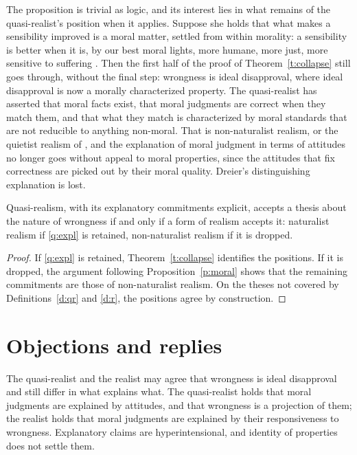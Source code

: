 \documentclass{situationist-preprint}
\begin{document}
The proposition is trivial as logic, and its interest lies in what remains of the quasi-realist's position when it applies. Suppose she holds that what makes a sensibility improved is a moral matter, settled from within morality: a sensibility is better when it is, by our best moral lights, more humane, more just, more sensitive to suffering \citep{Blackburn1998}. Then the first half of the proof of Theorem~\ref{t:collapse} still goes through, without the final step: wrongness is ideal disapproval, where ideal disapproval is now a morally characterized property. The quasi-realist has asserted that moral facts exist, that moral judgments are correct when they match them, and that what they match is characterized by moral standards that are not reducible to anything non-moral. That is non-naturalist realism, or the quietist realism of \citet{Dworkin1996}, and the explanation of moral judgment in terms of attitudes no longer goes without appeal to moral properties, since the attitudes that fix correctness are picked out by their moral quality. Dreier's distinguishing explanation is lost.

\begin{corollary}\label{c:indist}
Quasi-realism, with its explanatory commitments explicit, accepts a thesis about the nature of wrongness if and only if a form of realism accepts it: naturalist realism if \ref{q:expl} is retained, non-naturalist realism if it is dropped.
\end{corollary}

\begin{proof}
If \ref{q:expl} is retained, Theorem~\ref{t:collapse} identifies the positions. If it is dropped, the argument following Proposition~\ref{p:moral} shows that the remaining commitments are those of non-naturalist realism. On the theses not covered by Definitions~\ref{d:qr} and \ref{d:r}, the positions agree by construction.
\end{proof}

\section{Objections and replies}\label{s:obj}

\begin{objection}
The quasi-realist and the realist may agree that wrongness is ideal disapproval and still differ in what explains what. The quasi-realist holds that moral judgments are explained by attitudes, and that wrongness is a projection of them; the realist holds that moral judgments are explained by their responsiveness to wrongness. Explanatory claims are hyperintensional, and identity of properties does not settle them.
\end{objection}
\end{document}
